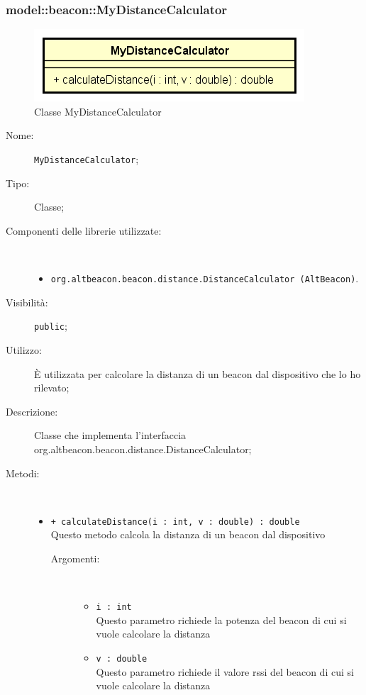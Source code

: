 \documentclass[../DefinizioneDiProdotto.tex]{subfiles}
\begin{document}
\subsubsection{model::beacon::MyDistanceCalculator}

    \begin{figure}[H]
        \centering
        \includegraphics{img/MyDistanceCalculator.png}
        \caption{Classe MyDistanceCalculator}\label{fig:model::beacon::MyDistanceCalculator} 
    \end{figure}
    \begin{description}
\item[Nome:] \texttt{MyDistanceCalculator};
\item[Tipo:] Classe;
\item[Componenti delle librerie utilizzate:] \
\begin{itemize}
\item \texttt{org.altbeacon.beacon.distance.DistanceCalculator (AltBeacon)}.

\end{itemize}
\item[Visibilità:] \texttt{public};
\item[Utilizzo:] È utilizzata per calcolare la distanza di un beacon dal dispositivo che lo ho rilevato;
\item[Descrizione:] Classe che implementa l'interfaccia\\org.altbeacon.beacon.distance.DistanceCalculator;
\item[Metodi:] \
\begin{itemize}
\item \texttt{+ calculateDistance(i : int, v : double) : double}\\
Questo metodo calcola la distanza di un beacon dal dispositivo
 \begin{description}
\item[Argomenti:] \
\begin{itemize}
\item \texttt{i : int}\\
Questo parametro richiede la potenza del beacon di cui si vuole calcolare la distanza\item \texttt{v : double}\\
Questo parametro richiede il valore rssi del beacon di cui si vuole calcolare la distanza\end{itemize}
\end{description}
\end{itemize}
\end{description}
\end{document}
